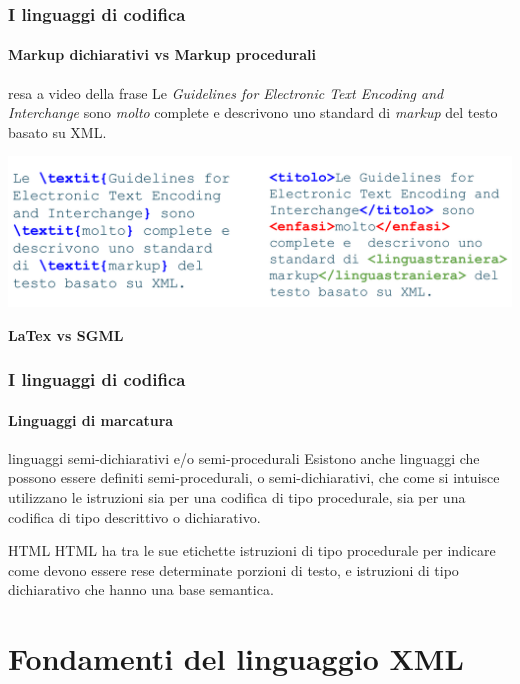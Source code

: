 \documentclass{beamer}
\begin{document}
\begin{frame}
	\frametitle{I linguaggi di codifica}
	\framesubtitle {Markup dichiarativi vs Markup procedurali}
	\addtocounter{nframe}{1}
	\begin{block}{resa a video della frase}
		Le \textit{Guidelines for Electronic Text Encoding and Interchange} sono \textit{molto} complete e descrivono uno standard di \textit{markup} del testo basato su XML.
	\end{block}

	\begin{center}
		\includegraphics[width=.85\textwidth]{imgs/Procedurale-Dichiarativo.png}
	\end{center}
    \begin{center}
    \textbf{LaTex vs SGML}
    \end{center}

\end{frame}

\begin{frame}
	\frametitle{I linguaggi di codifica}
	\framesubtitle{Linguaggi di marcatura}
	\addtocounter{nframe}{1}

	\begin{block}{linguaggi semi-dichiarativi e/o semi-procedurali}
		Esistono anche linguaggi che possono essere definiti
		semi-procedurali, o semi-dichiarativi, che come si intuisce utilizzano le istruzioni sia
		per una codifica di tipo procedurale, sia per una codifica di tipo descrittivo o
		dichiarativo.
	\end{block}

	\begin{block}{HTML}
		HTML ha tra le sue etichette istruzioni di tipo procedurale per indicare come devono essere rese determinate
		porzioni di testo, e istruzioni di tipo dichiarativo che hanno una base semantica.
	\end{block}



\end{frame}


\section{Fondamenti del linguaggio XML}

\end{document}
